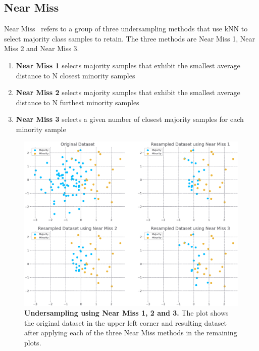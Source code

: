 \subsection{Near Miss}
\label{subsection:near-miss}

Near Miss~\cite{near-miss} refers to a group of three undersampling methods that use kNN to select
majority class samples to retain. The three methods are Near Miss 1, Near Miss 2 and Near Miss 3.

\begin{enumerate}
    \item \textbf{Near Miss 1} selects majority samples that exhibit the smallest average distance
        to $\mathrm{N}$ closest minority samples
    \item \textbf{Near Miss 2} selects majority samples that exhibit the smallest average distance
        to $\mathrm{N}$ furthest minority samples
    \item \textbf{Near Miss 3} selects a given number of closest majority samples for each minority
        sample
\end{enumerate}

\begin{figure}
    \centering
    \includegraphics[width=\linewidth]{figures/near_miss.eps}
    \caption{
        \textbf{Undersampling using Near Miss 1, 2 and 3.} The plot shows the original dataset in
        the upper left corner and resulting dataset after applying each of the three Near Miss
        methods in the remaining plots.
    }
    \label{figure:near-miss}
\end{figure}


